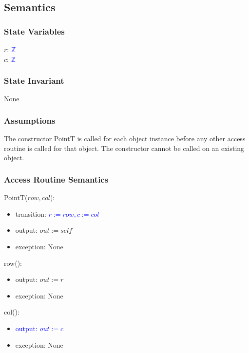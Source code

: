 \documentclass[12pt]{article}
\begin{document}
\subsection* {Semantics}

\subsubsection* {State Variables}

$r$: \textcolor{blue}{$\mathbb{Z}$}\\
$c$: \textcolor{blue}{$\mathbb{Z}$}\\

\subsubsection* {State Invariant}

None

\subsubsection* {Assumptions}

The constructor PointT is called for each object instance before any other
access routine is called for that object.  The constructor cannot be called on
an existing object.

\subsubsection* {Access Routine Semantics}

PointT($row, col$):
\begin{itemize}
\item transition: \textcolor{blue}{$r := row, c := col$}

\item output: $out := \mathit{self}$
\item exception: None
\end{itemize}

\noindent row():
\begin{itemize}
\item output: $out := r$
\item exception: None
\end{itemize}

\noindent col():
\begin{itemize}
\item \textcolor{blue}{output: $out := c$}
\item exception: None
\end{itemize}
\end{document}
